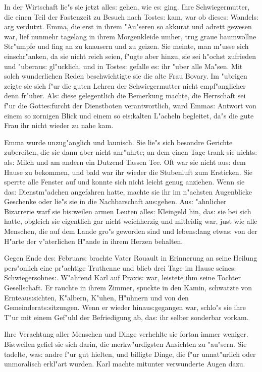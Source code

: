 \documentclass[oneside,12pt]{book}
\newcommand{\s}{s:}%
\begin{document}
In der Wirtschaft lie"s sie jetzt alle{\s} gehen, wie e{\s} ging.
Ihre Schwiegermutter, die einen Teil der Fastenzeit zu Besuch nach
Toste{\s} kam, war ob diese{\s} Wandel{\s} arg verdutzt. Emma, die
erst in ihrem "Au"seren so akkurat und adrett gewesen war, lief
nunmehr tagelang in ihrem Morgenkleide umher, trug graue
baumwollne Str"umpfe und fing an zu knausern und zu geizen. Sie
meinte, man m"usse sich einschr"anken, da sie nicht reich seien,
f"ugte aber hinzu, sie sei h"ochst zufrieden und "uberau{\s}
gl"ucklich, und in Toste{\s} gefalle e{\s} ihr "uber alle Ma"sen.
Mit solch wunderlichen Reden beschwichtigte sie die alte Frau
Bovary. Im "ubrigen zeigte sie sich f"ur die guten Lehren der
Schwiegermutter nicht empf"anglicher denn fr"uher. Al{\s} diese
gelegentlich die Bemerkung machte, die Herrschaft sei f"ur die
Gotte{\s}furcht der Dienstboten verantwortlich, ward Emma{\s}
Antwort von einem so zornigen Blick und einem so ei{\s}kalten
L"acheln begleitet, da"s die gute Frau ihr nicht wieder zu nahe
kam.

Emma wurde unzug"anglich und launisch. Sie lie"s sich besondre
Gerichte zubereiten, die sie dann aber nicht anr"uhrte; an dem
einen Tage trank sie nicht{\s} al{\s} Milch und am andern ein
Dutzend Tassen Tee. Oft war sie nicht au{\s} dem Hause zu
bekommen, und bald war ihr wieder die Stubenluft zum Ersticken.
Sie sperrte alle Fenster auf und konnte sich nicht leicht genug
anziehen. Wenn sie da{\s} Dienstm"adchen angefahren hatte, machte
sie ihr im n"achsten Augenblicke Geschenke oder lie"s sie in die
Nachbarschaft au{\s}gehen. Au{\s} "ahnlicher Bizarrerie warf sie
bi{\s}weilen armen Leuten alle{\s} Kleingeld hin, da{\s} sie bei
sich hatte, obgleich sie eigentlich gar nicht weichherzig und
mitleidig war, just wie alle Menschen, die auf dem Lande gro"s
geworden sind und leben{\s}lang etwa{\s} von der H"arte der
v"aterlichen H"ande in ihrem Herzen behalten.

Gegen Ende de{\s} Februar{\s} brachte Vater Rouault in Erinnerung
an seine Heilung pers"onlich eine pr"achtige Truthenne und blieb
drei Tage im Hause seine{\s} Schwiegersohne{\s}. W"ahrend Karl auf
Praxi{\s} war, leistete ihm seine Tochter Gesellschaft. Er rauchte
in ihrem Zimmer, spuckte in den Kamin, schwatzte von
Ernteau{\s}sichten, K"albern, K"uhen, H"uhnern und von den
Gemeinderat{\s}sitzungen. Wenn er wieder hinau{\s}gegangen war,
schlo"s sie ihre T"ur mit einem Gef"uhl der Befriedigung ab,
da{\s} ihr selber sonderbar vorkam.

Ihre Verachtung aller Menschen und Dinge verhehlte sie fortan
immer weniger. Bi{\s}weilen gefiel sie sich darin, die
merkw"urdigsten Ansichten zu "au"sern. Sie tadelte, wa{\s} andre
f"ur gut hielten, und billigte Dinge, die f"ur unnat"urlich oder
unmoralisch erkl"art wurden. Karl machte mitunter verwunderte
Augen dazu.
\end{document}
